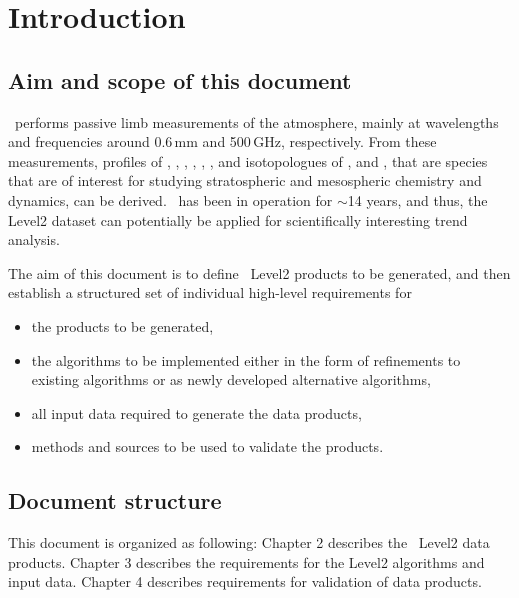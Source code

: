 \chapter{Introduction}
\label{chapter:introduction}


\setcounter{page}{1}


\section{Aim and scope of this document}
\label{sec:aim}
\smr\ performs passive limb measurements of the atmosphere,
mainly at wavelengths and frequencies around 0.6\,mm and 500\,GHz,
respectively.
From these measurements, profiles of 
, , , , 
, , and isotopologues of , and ,
that are species that are of interest for studying stratospheric and 
mesospheric chemistry and dynamics, can be derived. 
\smr\ has been in operation for \(\sim\)14 years, and thus, the Level2 
dataset can potentially be applied for scientifically interesting trend analysis.

The aim of this document is to define \smr\ Level2 products
to be generated, and then establish a structured set of 
individual high-level requirements for
\begin{itemize}
\item the products to be generated,
\item the algorithms to be implemented either in the form of refinements to existing
  algorithms or as newly developed alternative algorithms,
\item all input data required to generate the data products,
\item methods and sources to be used to validate the products.
\end{itemize}

\section{Document structure}
  
This document is organized as following:
Chapter 2 describes the \smr\ Level2 data products.
Chapter 3 describes the requirements for
the \smr Level2 algorithms and input data.
Chapter 4 describes requirements for validation
of \smr data products.


